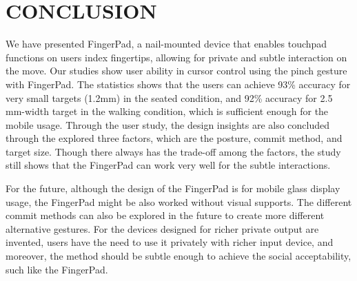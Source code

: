 \documentclass{article}
\begin{document}




\section{CONCLUSION}
We have presented FingerPad, a nail-mounted device that enables touchpad functions on users index fingertips, allowing for private and subtle interaction on the move. Our studies show user ability in cursor control using the pinch gesture with FingerPad. 
The statistics shows that the users can achieve 93\% accuracy for very small targets (1.2mm) in the seated condition, and 92\% accuracy for 2.5 mm-width target in the walking condition, which is sufficient enough for the mobile usage. 
Through the user study, the design insights are also concluded through the explored three factors, which are the posture, commit method, and target size.
Though there always has the trade-off among the factors, the study still shows that the FingerPad can work very well for the subtle interactions.

For the future, although the design of the FingerPad is for mobile glass display usage, the FingerPad might be also worked without visual supports. 
The different commit methods can also be explored in the future to create more different alternative gestures. 
For the devices designed for richer private output are invented, users have the need to use it privately with richer input device, and moreover, the method should be subtle enough to achieve the social acceptability, such like the FingerPad.   
\end{document}
